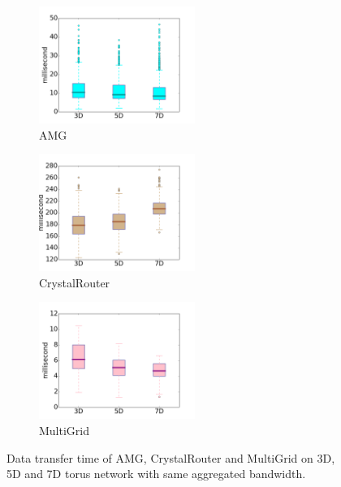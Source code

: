 \begin{figure}[t!]
    \centering
    \begin{subfigure}[t]{0.32\textwidth}
        \centering
        \includegraphics[height=1.5in]{figs/samebdw/amg}
        \caption{AMG}
        \label{fig:samebd-amg}
    \end{subfigure}%
    \hspace{1em}%
    \begin{subfigure}[t]{0.32\textwidth}
        \centering
        \includegraphics[height=1.5in]{figs/samebdw/cr}
        \caption{CrystalRouter}
        \label{fig:samebd-cr}
    \end{subfigure}%
    \begin{subfigure}[t]{0.32\textwidth}
        \centering
        \includegraphics[height=1.5in]{figs/samebdw/mg}
        \caption{MultiGrid}
        \label{fig:samebd-mg}
    \end{subfigure}%
   \caption{Data transfer time of AMG, CrystalRouter and MultiGrid on 3D, 5D and 7D torus network with same aggregated bandwidth. }
   \label{fig: bandwidth-time-box}
\end{figure}

